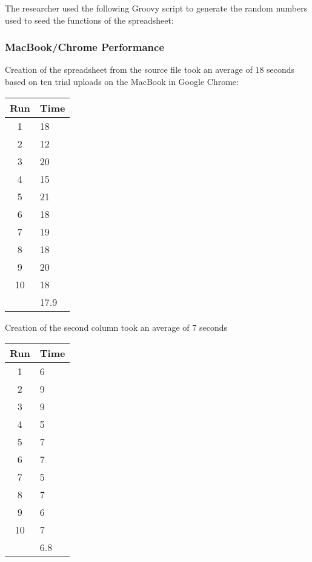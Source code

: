 \documentclass[12pt,oneside,letterpaper,titlepage]{article}
\begin{document}

The researcher used the following Groovy script to generate the random numbers
used to seed the functions of the spreadsheet:



\subsubsection{MacBook/Chrome Performance}

Creation of the spreadsheet from the source file took an average of 18 seconds
based on ten trial uploads on the MacBook in Google Chrome:

\begin{tabular}{| c | l |}
  \hline
  Run  & Time \\ \hline
  1    & 18   \\ \hline
  2    & 12   \\ \hline
  3    & 20   \\ \hline
  4    & 15   \\ \hline
  5    & 21   \\ \hline
  6    & 18   \\ \hline
  7    & 19   \\ \hline
  8    & 18   \\ \hline
  9    & 20   \\ \hline
  10   & 18   \\ \hline
       & 17.9 \\
  \hline
\end{tabular}

Creation of the second column took an average of 7 seconds

\begin{tabular}{| c | l |}
  \hline
  Run  & Time \\ \hline
  1    & 6    \\ \hline
  2    & 9    \\ \hline
  3    & 9    \\ \hline
  4    & 5    \\ \hline
  5    & 7    \\ \hline
  6    & 7    \\ \hline
  7    & 5    \\ \hline
  8    & 7    \\ \hline
  9    & 6    \\ \hline
  10   & 7    \\ \hline
       & 6.8  \\
  \hline
\end{tabular}
\end{document}
